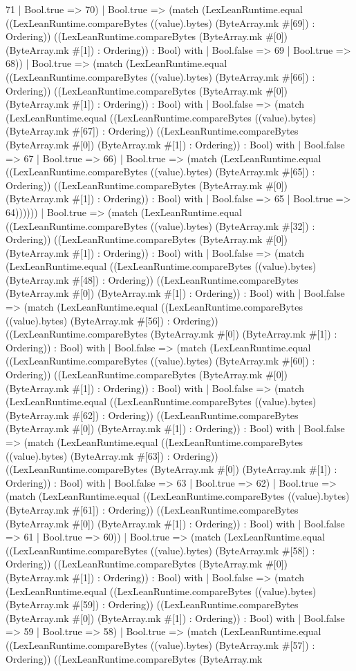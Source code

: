 \documentclass[11pt]{article}
\begin{document}
71 | Bool.true => 70) | Bool.true => (match (LexLeanRuntime.equal ((LexLeanRuntime.compareBytes ((value).bytes) (ByteArray.mk \#[69]) : Ordering)) ((LexLeanRuntime.compareBytes (ByteArray.mk \#[0]) (ByteArray.mk \#[1]) : Ordering)) : Bool) with | Bool.false => 69 | Bool.true => 68)) | Bool.true => (match (LexLeanRuntime.equal ((LexLeanRuntime.compareBytes ((value).bytes) (ByteArray.mk \#[66]) : Ordering)) ((LexLeanRuntime.compareBytes (ByteArray.mk \#[0]) (ByteArray.mk \#[1]) : Ordering)) : Bool) with | Bool.false => (match (LexLeanRuntime.equal ((LexLeanRuntime.compareBytes ((value).bytes) (ByteArray.mk \#[67]) : Ordering)) ((LexLeanRuntime.compareBytes (ByteArray.mk \#[0]) (ByteArray.mk \#[1]) : Ordering)) : Bool) with | Bool.false => 67 | Bool.true => 66) | Bool.true => (match (LexLeanRuntime.equal ((LexLeanRuntime.compareBytes ((value).bytes) (ByteArray.mk \#[65]) : Ordering)) ((LexLeanRuntime.compareBytes (ByteArray.mk \#[0]) (ByteArray.mk \#[1]) : Ordering)) : Bool) with | Bool.false => 65 | Bool.true => 64)))))) | Bool.true => (match (LexLeanRuntime.equal ((LexLeanRuntime.compareBytes ((value).bytes) (ByteArray.mk \#[32]) : Ordering)) ((LexLeanRuntime.compareBytes (ByteArray.mk \#[0]) (ByteArray.mk \#[1]) : Ordering)) : Bool) with | Bool.false => (match (LexLeanRuntime.equal ((LexLeanRuntime.compareBytes ((value).bytes) (ByteArray.mk \#[48]) : Ordering)) ((LexLeanRuntime.compareBytes (ByteArray.mk \#[0]) (ByteArray.mk \#[1]) : Ordering)) : Bool) with | Bool.false => (match (LexLeanRuntime.equal ((LexLeanRuntime.compareBytes ((value).bytes) (ByteArray.mk \#[56]) : Ordering)) ((LexLeanRuntime.compareBytes (ByteArray.mk \#[0]) (ByteArray.mk \#[1]) : Ordering)) : Bool) with | Bool.false => (match (LexLeanRuntime.equal ((LexLeanRuntime.compareBytes ((value).bytes) (ByteArray.mk \#[60]) : Ordering)) ((LexLeanRuntime.compareBytes (ByteArray.mk \#[0]) (ByteArray.mk \#[1]) : Ordering)) : Bool) with | Bool.false => (match (LexLeanRuntime.equal ((LexLeanRuntime.compareBytes ((value).bytes) (ByteArray.mk \#[62]) : Ordering)) ((LexLeanRuntime.compareBytes (ByteArray.mk \#[0]) (ByteArray.mk \#[1]) : Ordering)) : Bool) with | Bool.false => (match (LexLeanRuntime.equal ((LexLeanRuntime.compareBytes ((value).bytes) (ByteArray.mk \#[63]) : Ordering)) ((LexLeanRuntime.compareBytes (ByteArray.mk \#[0]) (ByteArray.mk \#[1]) : Ordering)) : Bool) with | Bool.false => 63 | Bool.true => 62) | Bool.true => (match (LexLeanRuntime.equal ((LexLeanRuntime.compareBytes ((value).bytes) (ByteArray.mk \#[61]) : Ordering)) ((LexLeanRuntime.compareBytes (ByteArray.mk \#[0]) (ByteArray.mk \#[1]) : Ordering)) : Bool) with | Bool.false => 61 | Bool.true => 60)) | Bool.true => (match (LexLeanRuntime.equal ((LexLeanRuntime.compareBytes ((value).bytes) (ByteArray.mk \#[58]) : Ordering)) ((LexLeanRuntime.compareBytes (ByteArray.mk \#[0]) (ByteArray.mk \#[1]) : Ordering)) : Bool) with | Bool.false => (match (LexLeanRuntime.equal ((LexLeanRuntime.compareBytes ((value).bytes) (ByteArray.mk \#[59]) : Ordering)) ((LexLeanRuntime.compareBytes (ByteArray.mk \#[0]) (ByteArray.mk \#[1]) : Ordering)) : Bool) with | Bool.false => 59 | Bool.true => 58) | Bool.true => (match (LexLeanRuntime.equal ((LexLeanRuntime.compareBytes ((value).bytes) (ByteArray.mk \#[57]) : Ordering)) ((LexLeanRuntime.compareBytes (ByteArray.mk 
\end{document}
